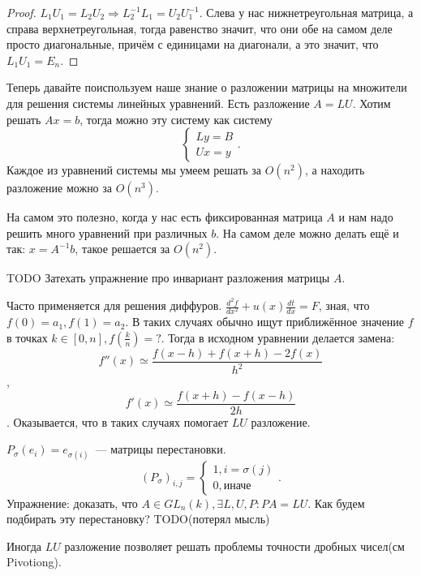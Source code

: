 \begin{proof}
    $L_1U_1 = L_2U_2\Rightarrow L_2^{-1}L_1 = U_2U_1^{-1}$. Слева у нас 
    нижнетреугольная матрица, а справа верхнетреугольная, тогда равенство значит,
    что они обе на самом деле просто диагональные, причём с единицами на диагонали, 
    а это значит, что $L_1U_1 = E_n$.
\end{proof}
\begin{remark}
    Теперь давайте поиспользуем наше знание о разложении матрицы на множители для 
    решения системы линейных уравнений.
    Есть разложение $A = LU$.
    Хотим решать $Ax = b$, 
    тогда можно эту систему как систему
    \[
    \begin{cases}
        Ly = B\\
        Ux = y
    \end{cases}
    .\] 
    Каждое из уравнений системы мы умеем решать за $O(n^2)$,
    а находить разложение можно за $O(n^3)$.

    На самом это полезно, когда у нас есть фиксированная матрица $A$ и 
    нам надо решить много уравнений при различных $b$.
    На самом деле можно делать ещё и так:
    $x = A^{-1}b$, такое решается за  $O(n^2)$.
\end{remark}
\begin{motivation}
    TODO Затехать упражнение про инвариант разложения матрицы $A$.
\end{motivation}
\begin{example}
    Часто применяется для решения диффуров. 
    $\frac{d^2f}{dx^2} + u(x)\frac{dt}{dx} = F$, зная, что $f(0) = a_1, f(1) = a_2$.
    В таких случаях обычно ищут приближённое значение $f$ в точках 
    $k\in[0,n], f(\frac{k}{n})=?$. Тогда в исходном уравнении делается замена:
    $$f''(x)\simeq \frac{f(x-h)+f(x+h)-2f(x)}{h^2}$$,
    $$f'(x)\simeq \frac{f(x+h) - f(x - h)}{2h}$$.
    Оказывается, что в таких случаях помогает $LU$ разложение.
\end{example}
\begin{example}
    $P_\sigma(e_i)= e_{\sigma(i)}$~--- матрицы перестановки.
     \[
         (P_\sigma)_{i,j} = \begin{cases}
             1, i = \sigma(j)\\
             0, \text{иначе}
         \end{cases}
    .\]
    Упражнение: доказать, что $A\in GL_n(k), \exists L, U, P\colon PA = LU$. 
    Как будем подбирать эту перестановку? TODO(потерял мысль)
\end{example}
\begin{remark}
    Иногда $LU$ разложение позволяет решать проблемы точности дробных чисел(см Pivotiong).
\end{remark}
